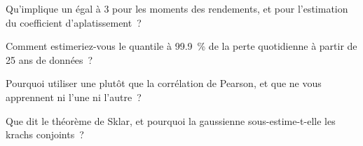 \begin{interviewq}\label{iq:qm:robust-statistics-and-heavy-tails:3}
Qu'implique un  égal à 3 pour les moments des rendements, et pour l'estimation du coefficient d'aplatissement~?
\end{interviewq}

\begin{interviewq}\label{iq:qm:robust-statistics-and-heavy-tails:4}
Comment estimeriez-vous le quantile à 99.9~\% de la perte quotidienne à partir de 25 ans de données~?
\end{interviewq}

\begin{interviewq}\label{iq:qm:robust-statistics-and-heavy-tails:5}
Pourquoi utiliser une  plutôt que la corrélation de Pearson, et que ne vous apprennent ni l'une ni l'autre~?
\end{interviewq}

\begin{interviewq}\label{iq:qm:robust-statistics-and-heavy-tails:6}
Que dit le théorème de Sklar, et pourquoi la  gaussienne sous-estime-t-elle les krachs conjoints~?
\end{interviewq}
